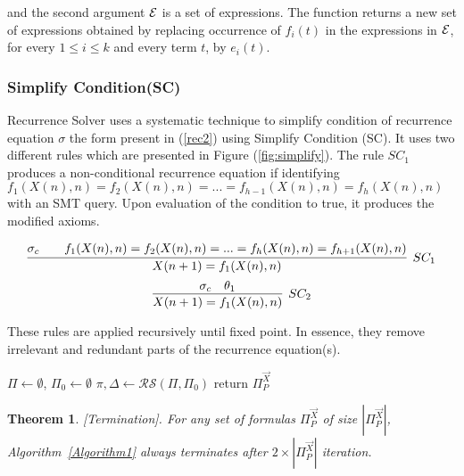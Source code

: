 \documentclass{article}
\newtheorem{theorem}{Theorem}
\begin{document}
and the second argument ${\cal E}$ is a set of expressions. The function returns a new set of expressions obtained by replacing occurrence of $f_i(t)$ in the expressions in ${\cal E}$, for every $1\leq i\leq k$ and every term $t$, by $e_i(t)$.



\subsubsection{Simplify Condition(SC)}

Recurrence Solver uses a systematic technique to simplify condition of recurrence equation $\sigma$ the form present in (\ref{rec2}) using Simplify Condition (SC). It uses two different rules which are presented in Figure (\ref{fig:simplify}). 
The rule $SC_1$  produces a non-conditional recurrence equation if  identifying $f_1(X(n),n)=f_2(X(n),n)=...=f_{h-1}(X(n),n)=f_{h}(X(n),n)$  with an SMT query. Upon evaluation of the condition to  true, it produces the modified axioms.  

\begin{figure*}[ht]
	\[
	\infer[SC_1]
	{X(n+1)=f_1(X(n),n)}
	{ \sigma_{c} && f_1(X(n),n)=f_2(X(n),n)=...=f_{h}(X(n),n)=f_{h+1}(X(n),n) }
	\]
	\[
	\infer[SC_2]
	{X(n+1)=f_1(X(n),n)}
	{
	\sigma_{c} & \theta_1
	}
	\]

\caption{The set of rules for simplifying $\sigma$ }
\label{fig:simplify}
\end{figure*}


These rules are applied recursively until fixed point. In essence, they remove irrelevant and redundant parts of the recurrence equation(s).


\begin{algorithm}
\SetAlgoLined
{}
 $\Pi \leftarrow  \emptyset$, $\Pi_0 \leftarrow  \emptyset$\;
  $\pi,\Delta \leftarrow \mathcal{RS}(\Pi,\Pi_0)$\;
  return $\Pi_P^{\vec{X}}$
 \caption{The Recurrence Solver}
 \label{Algorithm1}
\end{algorithm}
\begin{theorem}\label{theorm1}
[Termination]. For any set of formulas $\Pi_P^{\vec{X}}$ of size $|\Pi_P^{\vec{X}}|$, Algorithm~\ref{Algorithm1} always terminates after $2\times |\Pi_P^{\vec{X}}|$ iteration. 
\end{theorem}
\end{document}
